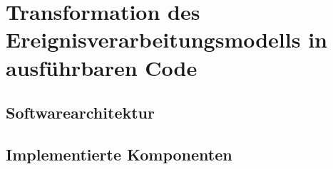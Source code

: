 \section{Transformation des Ereignisverarbeitungsmodells in ausführbaren Code}

\subsection{Softwarearchitektur}

\subsection{Implementierte Komponenten}

